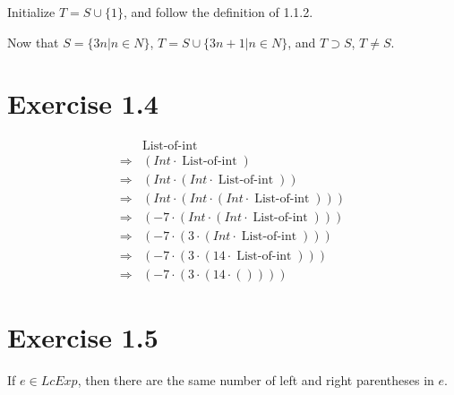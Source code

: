 \documentclass[11pt,a4paper]{article}
\DeclareMathOperator{\listofint}{List-of-int}
\begin{document}
Initialize $T = S \cup \{1\}$, and follow the definition of 1.1.2.

Now that
$S  = \{ 3n | n \in N \}$,
$T = S \cup \{3n+1 | n \in N\}$,
and $T \supset S$,  $ T \neq S $.

\section{Exercise 1.4}

\begin{align*}
    & \listofint \\
    \Rightarrow & (Int \cdot \listofint) \\
    \Rightarrow & (Int \cdot (Int \cdot \listofint)) \\
    \Rightarrow & (Int \cdot (Int \cdot (Int \cdot \listofint))) \\
    \Rightarrow & ( -7 \cdot (Int \cdot (Int \cdot \listofint))) \\
    \Rightarrow & ( -7 \cdot (  3 \cdot (Int \cdot \listofint))) \\
    \Rightarrow & ( -7 \cdot (  3 \cdot ( 14 \cdot \listofint))) \\
    \Rightarrow & ( -7 \cdot (  3 \cdot ( 14 \cdot         ())))
\end{align*}

\section{Exercise 1.5}

If $e \in LcExp$, then there are the same number of left
and right parentheses in $e$.
\end{document}
